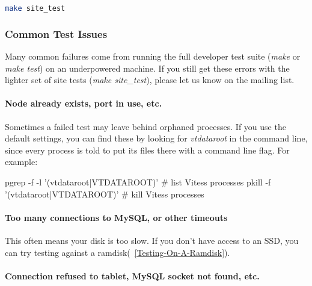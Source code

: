 \begin{lstlisting}[language=Bash]
make site_test
\end{lstlisting}

\subsubsection{Common Test Issues}\hypertarget{common-test-issues}{}\label{common-test-issues}

Many common failures come from running the full developer test suite
(\emph{make} or \emph{make test}) on an underpowered machine. If you still get
these errors with the lighter set of site tests (\emph{make site\_test}),
please let us know on the mailing list.

\paragraph{Node already exists, port in use, etc.}\hypertarget{node-already-exists-port-in-use-etc}{}\label{node-already-exists-port-in-use-etc}

Sometimes a failed test may leave behind orphaned processes.
If you use the default settings, you can find these by looking for
\emph{vtdataroot} in the command line, since every process is told to put
its files there with a command line flag. For example:
\begin{codesample4}
    pgrep -f -l '(vtdataroot|VTDATAROOT)' # list Vitess processes
    pkill -f '(vtdataroot|VTDATAROOT)'    # kill Vitess processes
\end{codesample4}


\paragraph{Too many connections to MySQL, or other timeouts}\hypertarget{too-many-connections-to-mysql-or-other-timeouts}{}\label{too-many-connections-to-mysql-or-other-timeouts}

This often means your disk is too slow. If you don't have access to an SSD,
you can try testing against a ramdisk(~\ref{Testing-On-A-Ramdisk}).

\paragraph{Connection refused to tablet, MySQL socket not found, etc.}\hypertarget{connection-refused-to-tablet-mysql-socket-not-found-etc}{}\label{connection-refused-to-tablet-mysql-socket-not-found-etc}

